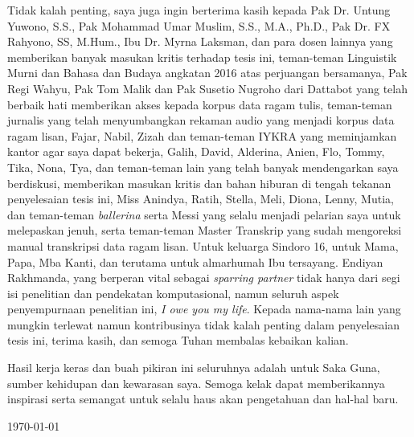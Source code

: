 Tidak kalah penting, saya juga ingin berterima kasih kepada Pak Dr. Untung Yuwono, S.S., Pak Mohammad Umar Muslim, S.S., M.A., Ph.D., Pak Dr. FX Rahyono, SS, M.Hum., Ibu Dr. Myrna Laksman, dan para dosen lainnya yang memberikan banyak masukan kritis terhadap tesis ini, teman-teman Linguistik Murni dan Bahasa dan Budaya angkatan 2016 atas perjuangan bersamanya, Pak Regi Wahyu, Pak Tom Malik dan Pak Susetio Nugroho dari Dattabot yang telah berbaik hati memberikan akses kepada korpus data ragam tulis, teman-teman jurnalis yang telah menyumbangkan rekaman audio yang menjadi korpus data ragam lisan, Fajar, Nabil, Zizah dan teman-teman IYKRA yang meminjamkan kantor agar saya dapat bekerja, Galih, David, Alderina, Anien, Flo, Tommy, Tika, Nona, Tya, dan teman-teman lain yang telah banyak mendengarkan saya berdiskusi, memberikan masukan kritis dan bahan hiburan di tengah tekanan penyelesaian tesis ini, Miss Anindya, Ratih, Stella, Meli, Diona, Lenny, Mutia, dan teman-teman \textit{ballerina} serta Messi yang selalu menjadi pelarian saya untuk melepaskan jenuh, serta teman-teman Master Transkrip yang sudah mengoreksi manual transkripsi data ragam lisan. Untuk keluarga Sindoro 16, untuk Mama, Papa, Mba Kanti, dan terutama untuk almarhumah Ibu tersayang. Endiyan Rakhmanda, yang berperan vital sebagai \textit{sparring partner} tidak hanya dari segi isi penelitian dan pendekatan komputasional, namun seluruh aspek penyempurnaan penelitian ini, \textit{I owe you my life}. Kepada nama-nama lain yang mungkin terlewat namun kontribusinya tidak kalah penting dalam penyelesaian tesis ini, terima kasih, dan semoga Tuhan membalas kebaikan kalian.

Hasil kerja keras dan buah pikiran ini seluruhnya adalah untuk Saka Guna, sumber kehidupan dan kewarasan saya. Semoga kelak dapat memberikannya inspirasi serta semangat untuk selalu haus akan pengetahuan dan hal-hal baru.

\vspace*{0.1cm}
\begin{flushright}
\today\\[0.1cm]
\vspace*{1cm}
\penulis

\end{flushright}
